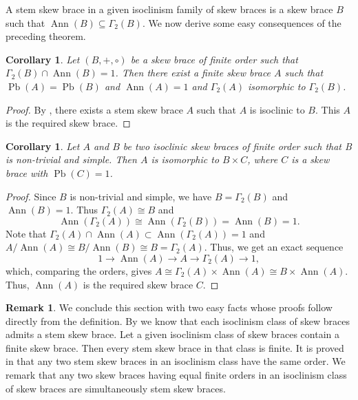 \documentclass[oneside]{amsart}
\numberwithin{equation}{section}
\theoremstyle{plain}
\newtheorem{cor}[equation]{Corollary}
\theoremstyle{definition}
\newtheorem{remark}[equation]{Remark}
\newcommand{\Pb}{\operatorname{Pb} }
\newcommand{\Ann}{\operatorname{Ann} }
\begin{document}
A stem skew brace in a given isoclinism family of skew braces is a skew brace $B$  such that $\Ann(B)\subseteq \Gamma_2(B)$. We now derive some easy consequences of the preceding theorem.
\begin{cor}
  Let $(B,+,\circ)$ be a skew  brace of finite order such that $\Gamma_2(B) \cap \Ann(B)=1$.  Then there exist a finite skew  brace $A$ such that $\Pb(A)=\Pb(B)$ and $\Ann(A)=1$ and $\Gamma_2(A)$ isomorphic to $\Gamma_2(B)$.
\end{cor}
 \begin{proof}
By  \cite[Theorem 2.18]{LV23}, there exists a stem skew brace $A$ such that $A$ is isoclinic to $B$. This $A$ is the required skew brace.
\end{proof}    
    
\begin{cor}
Let $A$ and $B$ be two isoclinic skew  braces of finite order such that B is non-trivial and simple. Then $A$ is isomorphic to $B \times C$, where $C$ is a skew  brace with $\Pb(C)=1$.
\end{cor}
\begin{proof}
  Since $B$ is non-trivial and simple, we have $B = \Gamma_2(B)$ and $\Ann(B) = 1$. Thus $\Gamma_2(A) \cong B$ and $$\Ann(\Gamma_2(A)) \cong \Ann(\Gamma_2(B)) = \Ann(B) = 1.$$
  Note that $\Gamma_2(A) \cap \Ann(A) \subset \Ann(\Gamma_2(A)) = 1$ and $A/\Ann(A) \cong B/\Ann(B) \cong B = \Gamma_2(A)$. Thus, we get an exact sequence
  $$1 \to \Ann(A) \to A \to \Gamma_2(A) \to 1,$$
  which, comparing the orders, gives $A \cong  \Gamma_2(A) \times \Ann(A) \cong B \times \Ann(A)$. Thus, $\Ann(A)$ is the required skew brace $C$. 
\end{proof}

\begin{remark}
We conclude this section with two easy facts whose proofs follow directly from the definition. By \cite[Theorem 2.18]{LV23} we know that each isoclinism class of skew braces admits a stem skew brace. Let a given isoclinism class of skew braces contain a finite skew brace. Then every stem skew brace in that class is finite. It is proved in \cite[Proposition 2.17]{LV23} that any two stem skew braces in an isoclinism class have the same order. We remark that any two skew braces having equal finite orders in an isoclinism class of skew braces are simultaneously stem skew braces. 
\end{remark}


 
 
 
\end{document}
